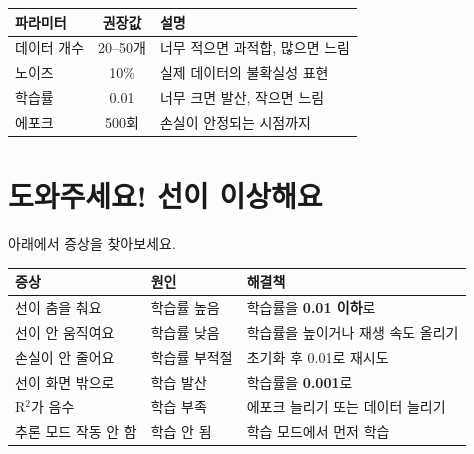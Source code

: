 \documentclass[11pt, a4paper]{article}
\begin{document}
\begin{center}
\begin{tabular}{lcp{7cm}}
    \toprule
    \textbf{파라미터} & \textbf{권장값} & \textbf{설명} \\
    \midrule
    데이터 개수 & 20--50개 & 너무 적으면 과적합, 많으면 느림 \\
    노이즈 & 10\% & 실제 데이터의 불확실성 표현 \\
    학습률 & 0.01 & 너무 크면 발산, 작으면 느림 \\
    에포크 & 500회 & 손실이 안정되는 시점까지 \\
    \bottomrule
\end{tabular}
\end{center}

\section{ 도와주세요! 선이 이상해요}

\begin{warningbox}
아래에서 증상을 찾아보세요.
\end{warningbox}

\vspace{0.3cm}

\begin{center}
\begin{tabular}{llp{5cm}}
    \toprule
    \textbf{증상} & \textbf{원인} & \textbf{해결책} \\
    \midrule
    선이 춤을 춰요 & 학습률 높음 & 학습률을 \textbf{0.01 이하}로 \\
    선이 안 움직여요 & 학습률 낮음 & 학습률을 높이거나 재생 속도 올리기 \\
    손실이 안 줄어요 & 학습률 부적절 & 초기화 후 0.01로 재시도 \\
    선이 화면 밖으로 & 학습 발산 & 학습률을 \textbf{0.001}로 \\
    R$^2$가 음수 & 학습 부족 & 에포크 늘리기 또는 데이터 늘리기 \\
    추론 모드 작동 안 함 & 학습 안 됨 & 학습 모드에서 먼저 학습 \\
    \bottomrule
\end{tabular}
\end{center}

\end{document}
